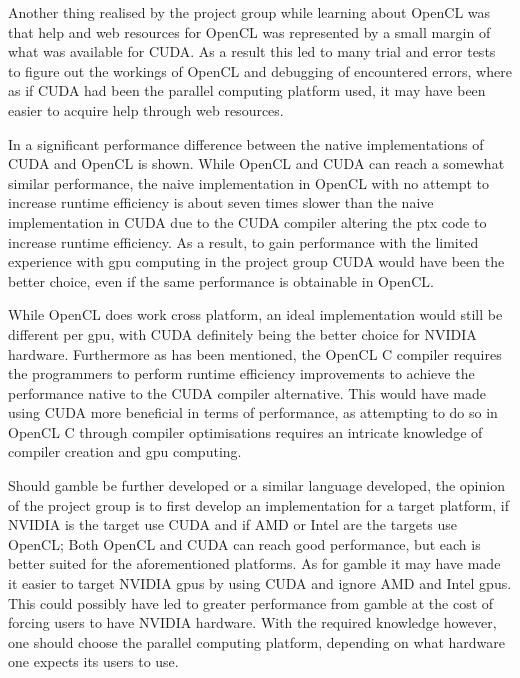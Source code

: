 Another thing realised by the project group while learning about OpenCL was that help and web resources for OpenCL was represented by a small margin of what was available for CUDA.
As a result this led to many trial and error tests to figure out the workings of OpenCL and debugging of encountered errors, where as if CUDA had been the parallel computing platform used, it may have been easier to acquire help through web resources.

In  a significant performance difference between the native implementations of CUDA and OpenCL is shown.
While OpenCL and CUDA can reach a somewhat similar performance, the naive implementation in OpenCL with no attempt to increase runtime efficiency is about seven times slower than the naive implementation in CUDA due to the CUDA compiler altering the \acrshort{ptx} code to increase runtime efficiency.
As a result, to gain performance with the limited experience with \acrshort{gpu} computing in the project group CUDA would have been the better choice, even if the same performance is obtainable in OpenCL.

While OpenCL does work cross platform, an ideal implementation would still be different per \acrshort{gpu}, with CUDA definitely being the better choice for NVIDIA hardware.
Furthermore as has been mentioned, the OpenCL C compiler requires the programmers to perform runtime efficiency improvements to achieve the performance native to the CUDA compiler alternative.
This would have made using CUDA more beneficial in terms of performance, as attempting to do so in OpenCL C through compiler optimisations requires an intricate knowledge of compiler creation and \acrshort{gpu} computing.

Should \gls{gamble} be further developed or a similar language developed, the opinion of the project group is to first develop an implementation for a target platform, if NVIDIA is the target use CUDA and if AMD or Intel are the targets use OpenCL; Both OpenCL and CUDA can reach good performance, but each is better suited for the aforementioned platforms.
As for \gls{gamble} it may have made it easier to target NVIDIA \acrshort{gpu}s by using CUDA and ignore AMD and Intel \acrshort{gpu}s. 
This could possibly have led to greater performance from \acrshort{gamble} at the cost of forcing users to have NVIDIA hardware.
With the required knowledge however, one should choose the parallel computing platform, depending on what hardware one expects its users to use.